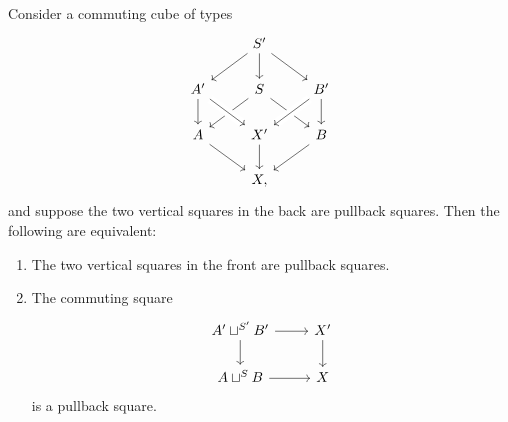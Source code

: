 
\begin{thm}\label{thm:cartesian_cube}
Consider a commuting cube of types 
\begin{equation*}\label{eq:cube}
\begin{tikzcd}
& S' \arrow[dl] \arrow[dr] \arrow[d] \\
A' \arrow[d] & S \arrow[dl] \arrow[dr] & B' \arrow[dl,crossing over] \arrow[d] \\
A \arrow[dr] & X' \arrow[d] \arrow[from=ul,crossing over] & B \arrow[dl] \\
& X,
\end{tikzcd}
\end{equation*}
and suppose the two vertical squares in the back are pullback squares. Then the following are equivalent:
\begin{enumerate}
\item The two vertical squares in the front are pullback squares.
\item The commuting square
\begin{equation*}
\begin{tikzcd}
A' \sqcup^{S'} B' \arrow[r] \arrow[d] & X' \arrow[d] \\
A\sqcup^{S} B \arrow[r] & X
\end{tikzcd}
\end{equation*}
is a pullback square.
\end{enumerate}
\end{thm}

